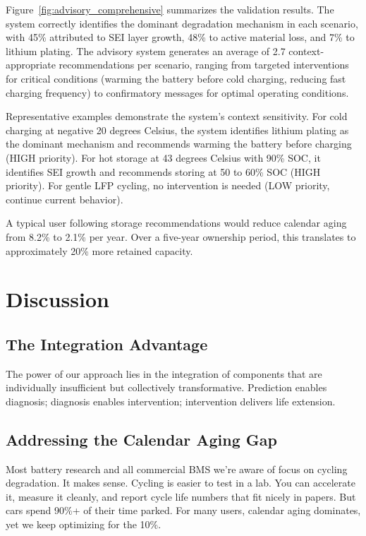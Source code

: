 \documentclass[5p,times,authoryear]{elsarticle}
\begin{document}
Figure~\ref{fig:advisory_comprehensive} summarizes the validation results. The system correctly identifies the dominant degradation mechanism in each scenario, with 45\% attributed to SEI layer growth, 48\% to active material loss, and 7\% to lithium plating. The advisory system generates an average of 2.7 context-appropriate recommendations per scenario, ranging from targeted interventions for critical conditions (warming the battery before cold charging, reducing fast charging frequency) to confirmatory messages for optimal operating conditions.



Representative examples demonstrate the system's context sensitivity. For cold charging at negative 20 degrees Celsius, the system identifies lithium plating as the dominant mechanism and recommends warming the battery before charging (HIGH priority). For hot storage at 43 degrees Celsius with 90\% SOC, it identifies SEI growth and recommends storing at 50 to 60\% SOC (HIGH priority). For gentle LFP cycling, no intervention is needed (LOW priority, continue current behavior).

A typical user following storage recommendations would reduce calendar aging from 8.2\% to 2.1\% per year. Over a five-year ownership period, this translates to approximately 20\% more retained capacity.


\section{Discussion}

\subsection{The Integration Advantage}

The power of our approach lies in the integration of components that are individually insufficient but collectively transformative. Prediction enables diagnosis; diagnosis enables intervention; intervention delivers life extension.

\subsection{Addressing the Calendar Aging Gap}

Most battery research and all commercial BMS we're aware of focus on cycling degradation. It makes sense. Cycling is easier to test in a lab. You can accelerate it, measure it cleanly, and report cycle life numbers that fit nicely in papers. But cars spend 90\%+ of their time parked. For many users, calendar aging dominates, yet we keep optimizing for the 10\%.
\end{document}
